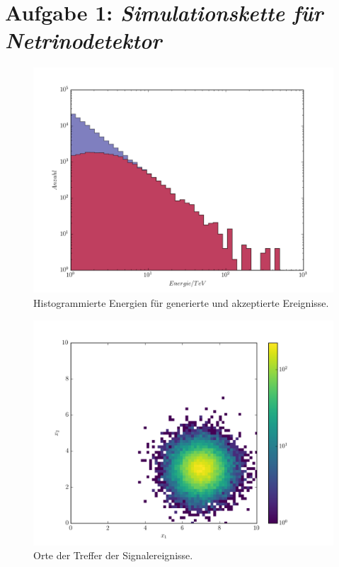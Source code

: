 \section*{Aufgabe 1: \emph{Simulationskette für Netrinodetektor}}

\begin{figure}[htbp]
	\centering
	\includegraphics[width=1\textwidth]{b_hist.png}
	\caption{Histogrammierte Energien für generierte und akzeptierte Ereignisse.}
\end{figure}

\begin{figure}[htbp]
	\centering
	\includegraphics[width=1\textwidth]{x1_x2_hist_signal.png}
	\caption{Orte der Treffer der Signalereignisse.}
\end{figure}

